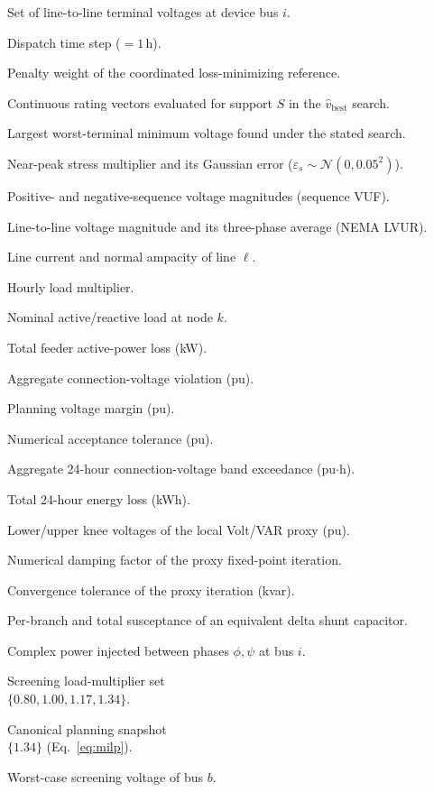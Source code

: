 \documentclass{ieeeaccess}
\newcommand{\SI}[2]{#1\,\ensuremath{\mathrm{#2}}}
\newcommand{\Imax}{I^{\max}}
\newcommand{\Vviol}{V_{\mathrm{viol}}}
\begin{document}
\begin{IEEEdescription}[\IEEEsetlabelwidth{$P^0_{L,k},Q^0_{L,k}$~}]
\item[$\mathcal M_i$] Set of line-to-line terminal voltages at device bus $i$.
\item[$\Delta t$] Dispatch time step ($=\SI{1}{h}$).
\item[$\rho$] Penalty weight of the coordinated loss-minimizing reference.
\item[$\mathcal Q_{\mathrm{eval}}(S)$] Continuous rating vectors evaluated for support $S$ in the $\hat v_{\mathrm{best}}$ search.
\item[$\hat v_{\mathrm{best}}$] Largest worst-terminal minimum voltage found under the stated search.
\item[$\lambda_s,\varepsilon_s$] Near-peak stress multiplier and its Gaussian error ($\varepsilon_s\sim\mathcal N(0,0.05^2)$).
\item[$V_1,V_2$] Positive- and negative-sequence voltage magnitudes (sequence VUF).
\item[$U_{ab},U_{\mathrm{avg}}$] Line-to-line voltage magnitude and its three-phase average (NEMA LVUR).
\item[$I_\ell,\Imax_\ell$] Line current and normal ampacity of line $\ell$.
\item[$\lambda(t)$] Hourly load multiplier.
\item[$P^0_{L,k},Q^0_{L,k}$] Nominal active/reactive load at node $k$.
\item[$P_{\mathrm{loss}}$] Total feeder active-power loss (kW).
\item[$\Vviol$] Aggregate connection-voltage violation (pu).
\item[$m_v$] Planning voltage margin (pu).
\item[$\varepsilon_{\mathrm{num}}$] Numerical acceptance tolerance (pu).
\item[$E_v$] Aggregate 24-hour connection-voltage band exceedance (pu$\cdot$h).
\item[$E_{\mathrm{loss}}$] Total 24-hour energy loss (kWh).
\item[$V_i^\downarrow,V_i^\uparrow$] Lower/upper knee voltages of the local Volt/VAR proxy (pu).
\item[$\beta$] Numerical damping factor of the proxy fixed-point iteration.
\item[$\varepsilon_Q$] Convergence tolerance of the proxy iteration (kvar).
\item[$B_{\phi\psi},B_\Delta$] Per-branch and total susceptance of an equivalent delta shunt capacitor.
\item[$S_{i,\phi\psi}$] Complex power injected between phases $\phi,\psi$ at bus $i$.
\item[$\Lambda$] Screening load-multiplier set\\ $\{0.80,1.00,1.17,1.34\}$.
\item[$\Lambda_{\mathrm{plan}}$] Canonical planning snapshot\\ $\{1.34\}$ (Eq.~\eqref{eq:milp}).
\item[$R_b$] Worst-case screening voltage of bus $b$.
\end{IEEEdescription}
\end{document}
